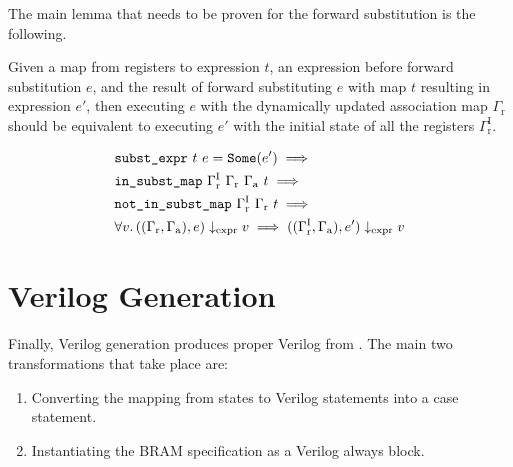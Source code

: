 The main lemma that needs to be proven for the forward substitution is the
following.

\begin{lemma}%
  \label{lem:hg:forward-substitution-of-expressions}

  Given a map from registers to expression $t$, an expression before forward
  substitution $e$, and the result of forward substituting $e$ with map $t$
  resulting in expression $e'$, then executing $e$ with the dynamically updated
  association map $\Gamma_{\mathrm r}$ should be equivalent to executing $e'$
  with the initial state of all the registers $\Gamma^{\mathrm{I}}_{\mathrm r}$.

  {\normalfont
    \begin{equation*}
      \begin{aligned}
        &\texttt{subst\_expr}\ t\ e = \texttt{Some}(e') \implies \\
        &\texttt{in\_subst\_map}\ \Gamma^{\mathrm{I}}_{\mathrm r}\ \Gamma_{\mathrm r}\ \Gamma_{\mathrm a}\ t \implies\\
        &\texttt{not\_in\_subst\_map}\ \Gamma^{\mathrm{I}}_{\mathrm r}\ \Gamma_{\mathrm r}\ t \implies\\
        &\forall v\ldotp ((\Gamma_{\mathrm r}, \Gamma_{\mathrm a}), e) \downarrow_{\text{expr}} v
          \implies ((\Gamma^{\mathrm{I}}_{\mathrm r}, \Gamma_{\mathrm a}), e') \downarrow_{\text{expr}} v
      \end{aligned}
    \end{equation*}}
\end{lemma}


\section{Verilog Generation}%
\label{sec:hg:verilog-generation}

Finally, Verilog generation produces proper Verilog from \htl{}.  The main two
transformations that take place are:

\begin{enumerate}
\item Converting the mapping from states to Verilog statements into a case
  statement.
\item Instantiating the \gls{BRAM} specification as a Verilog always block.
\end{enumerate}

